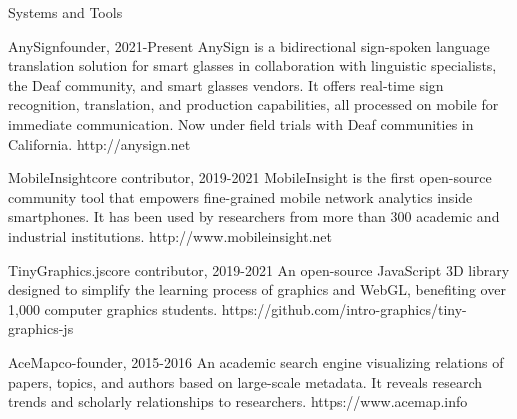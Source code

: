 \documentclass{resume} %
\begin{document}
\begin{rSection}{Systems and Tools}

\begin{rProject}
{AnySign}{founder, 2021-Present}
{AnySign is a bidirectional sign-spoken language translation solution for smart glasses in collaboration with linguistic specialists, the Deaf community, and smart glasses vendors. It offers real-time sign recognition, translation, and production capabilities, all processed on mobile for immediate communication. Now under field trials with Deaf communities in California.}
{http://anysign.net}
\end{rProject}

\begin{rProject}
{MobileInsight}{core contributor, 2019-2021}
{MobileInsight is the first open-source community tool that empowers fine-grained mobile network analytics inside smartphones. It has been used by researchers from more than 300 academic and industrial institutions.}
{http://www.mobileinsight.net}
\end{rProject}

\begin{rProject}
{TinyGraphics.js}{core contributor, 2019-2021}
{An open-source JavaScript 3D library designed to simplify the learning process of graphics and WebGL, benefiting over 1,000 computer graphics students.}
{https://github.com/intro-graphics/tiny-graphics-js}
\end{rProject}

\begin{rProject}
{AceMap}{co-founder, 2015-2016}
{An academic search engine visualizing relations of papers, topics, and authors based on large-scale metadata. It reveals research trends and scholarly relationships to researchers.}
{https://www.acemap.info}
\end{rProject}

\end{rSection}
\end{document}
